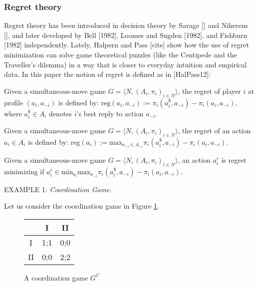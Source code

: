 \documentclass[fleqn,reqno,11pt]{article}
\begin{document}
\subsubsection{Regret theory} \label{sec:regreTheory}

Regret theory has been introduced in decision theory by Savage [] and Niherens [], and later developed by Bell [1982], Loomes and Sugden [1982], and Fishburn [1982] independently. Lately, Halpern and Pass [cite] show how the use of regret minimization can solve game theoretical puzzles (like the Centipede and the Traveller's dilemma) in a way that is closer to everyday intuition and empirical data. In this paper the notion of regret is defined as in [HalPass12]:

\begin{definition} \label{defn:parwreg}
Given a simultaneous-move game $ G=\langle N, (A_i , \pi_i)_{i \in N} \rangle $, the regret of player $i$ at profile $(a_i,a_{-i})$ is defined by: $\text{reg}(a_i,a_{-i}):= \pi_i(a_i^\$,a_{-i})-\pi_i(a_i,a_{-i}) $, where $a_i^\$ \in A_i$ denotes $i$'s best reply to action $a_{-i} $.
\end{definition}

\begin{definition}[Regret] \label{defn:regret}
Given a simultaneous-move game $ G=\langle N, (A_i , \pi_i)_{i \in N} \rangle $, the regret of an action $a_i \in A_i$ is defined by: $\text{reg}(a_i):= \text{max}_{a_{-i}\in A_{-i}} \pi_i(a_i^\$,a_{-i})-\pi_i(a_i,a_{-i}) $.
\end{definition}

\begin{definition} \label{defn:regmin}
Given a simultaneous-move game $ G=\langle N, (A_i , \pi_i)_{i \in N} \rangle $, an action $a^{r}_i $ is regret minimizing if $a^{r}_i \in \text{min}_{a_i} \text{max}_{a_{-i}} \pi_i(a_i^\$,a_{-i})-\pi_i(a_i,a_{-i}) $.
\end{definition}

EXAMPLE 1: \textit{Coordination Game.}

Let us consider the coordination game in Figure \ref{coordgame1}.

\begin{figure}
\begin{center}%
\begin{tabular}{|c|c|c|}
\hline 
 & I & II\tabularnewline
\hline 
\hline 
I & 1;1 & 0;0\tabularnewline
\hline 
II & 0;0 & 2;2\tabularnewline
\hline 
\end{tabular}\end{center}

\protect\caption{A coordination game $G^C$}
\label{coordgame1}
\end{figure}
\end{document}
